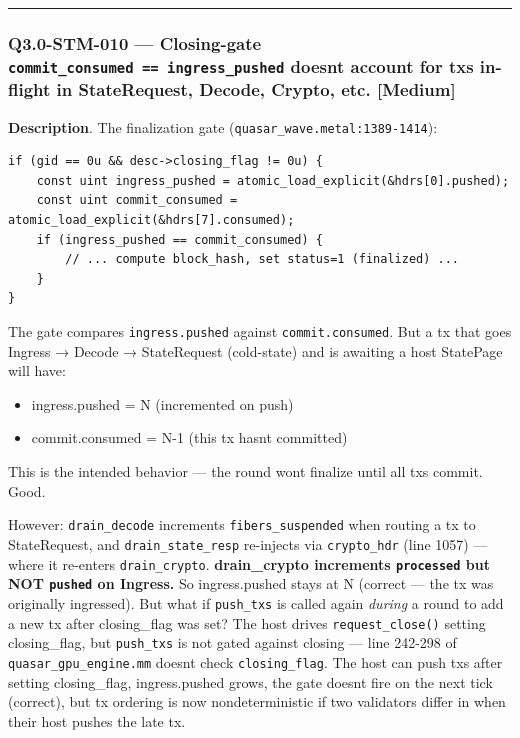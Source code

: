 \documentclass[
]{article}
\providecommand{\tightlist}{%
  \setlength{\itemsep}{0pt}\setlength{\parskip}{0pt}}
\begin{document}
\begin{center}\rule{0.5\linewidth}{0.5pt}\end{center}

\subsubsection{\texorpdfstring{Q3.0-STM-010 --- Closing-gate
\texttt{commit\_consumed\ ==\ ingress\_pushed} doesn\textquotesingle t
account for txs in-flight in StateRequest, Decode, Crypto, etc.
{[}Medium{]}}{Q3.0-STM-010 --- Closing-gate commit\_consumed == ingress\_pushed doesn\textquotesingle t account for txs in-flight in StateRequest, Decode, Crypto, etc. {[}Medium{]}}}\label{q30-stm-010--closing-gate-commit_consumed--ingress_pushed-doesnt-account-for-txs-in-flight-in-staterequest-decode-crypto-etc-medium}

\textbf{Description}. The finalization gate
(\texttt{quasar\_wave.metal:1389-1414}):

\begin{verbatim}
if (gid == 0u && desc->closing_flag != 0u) {
    const uint ingress_pushed = atomic_load_explicit(&hdrs[0].pushed);
    const uint commit_consumed = atomic_load_explicit(&hdrs[7].consumed);
    if (ingress_pushed == commit_consumed) {
        // ... compute block_hash, set status=1 (finalized) ...
    }
}
\end{verbatim}

The gate compares \texttt{ingress.pushed} against
\texttt{commit.consumed}. But a tx that goes Ingress → Decode →
StateRequest (cold-state) and is awaiting a host StatePage will have:

\begin{itemize}
\tightlist
\item
  ingress.pushed = N (incremented on push)
\item
  commit.consumed = N-1 (this tx hasn\textquotesingle t committed)
\end{itemize}

This is the intended behavior --- the round won\textquotesingle t
finalize until all txs commit. Good.

However: \texttt{drain\_decode} increments \texttt{fibers\_suspended}
when routing a tx to StateRequest, and \texttt{drain\_state\_resp}
re-injects via \texttt{crypto\_hdr} (line 1057) --- where it re-enters
\texttt{drain\_crypto}. \textbf{drain\_crypto increments
\texttt{processed} but NOT \texttt{pushed} on Ingress.} So
ingress.pushed stays at N (correct --- the tx was originally ingressed).
But what if \texttt{push\_txs} is called again \emph{during} a round to
add a new tx after closing\_flag was set? The host drives
\texttt{request\_close()} setting closing\_flag, but \texttt{push\_txs}
is not gated against closing --- line 242-298 of
\texttt{quasar\_gpu\_engine.mm} doesn\textquotesingle t check
\texttt{closing\_flag}. The host can push txs after setting
closing\_flag, ingress.pushed grows, the gate doesn\textquotesingle t
fire on the next tick (correct), but tx ordering is now nondeterministic
if two validators differ in when their host pushes the late tx.
\end{document}
